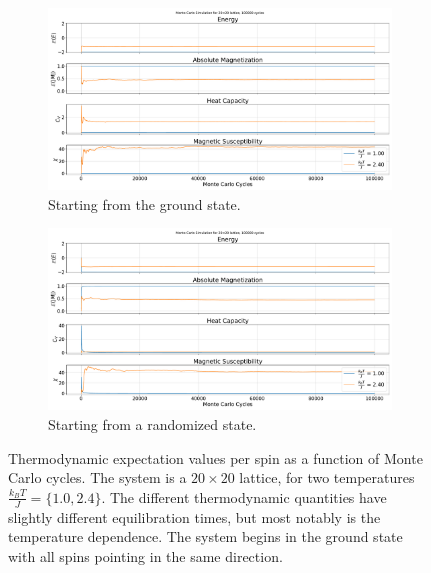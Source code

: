 \documentclass[../main.tex]{subfiles}
\begin{document}
\begin{figure}[htb!]
    \centering
    \begin{subfigure}[b]{\textwidth}
    \centering
    \includegraphics[trim=0.cm 0.cm 0.cm 1.cm, clip,width=1.0\textwidth]{../figures/MC_ising_20x20_1E5_cycles_T_1.0_2.4_rng_0.pdf}
    \caption{Starting from the ground state.}
    \label{fig:equilibration-time-no-rng}
    \end{subfigure}
    
    \begin{subfigure}[b]{\textwidth}
    \centering
    \includegraphics[trim=0.cm 0.cm 0.cm 1.cm, clip,width=1.0\textwidth]{../figures/MC_ising_20x20_1E5_cycles_T_1.0_2.4_rng_1.pdf}
    \caption{Starting from a randomized state.}
    \label{fig:equilibration-time-rng}
    \end{subfigure}
    \caption{Thermodynamic expectation values per spin as a function of Monte Carlo cycles. The system is a $20 \times 20$ lattice, for two temperatures $\frac{k_B T}{J} = \{1.0, 2.4\}$. The different thermodynamic quantities have slightly different equilibration times, but most notably is the temperature dependence. The system begins in the ground state with all spins pointing in the same direction.}
    \label{fig:equilibration-time}
\end{figure}
\end{document}
